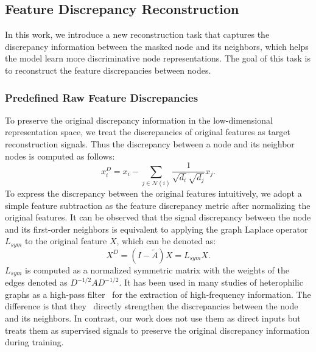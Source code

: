\documentclass[sigconf]{acmart}
\begin{document}
\subsection{Feature Discrepancy Reconstruction}
In this work, we introduce a new reconstruction task that captures the discrepancy information between the masked node and its neighbors, which helps the model learn more discriminative node representations. The goal of this task is to reconstruct the feature discrepancies between nodes.

\subsubsection{Predefined Raw Feature Discrepancies} 
To preserve the original discrepancy information in the low-dimensional representation space, we treat the discrepancies of original features as target reconstruction signals. Thus the discrepancy between a node and its neighbor nodes is computed as follows:
\begin{equation}
x_i^{D} = x_i-\sum\limits_{j \in \mathcal{N}(i)}\frac{1}{\sqrt{d_i} \sqrt{d_j}}x_j.\label{Eq4}
\end{equation}
To express the discrepancy between the original features intuitively, we adopt a simple feature subtraction as the feature discrepancy metric after normalizing the original features. It can be observed that the signal discrepancy between the node and its first-order neighbors is equivalent to applying the graph Laplace operator $L_{sym}$ to the original feature $X$, which can be denoted as:
\begin{equation}
    X^D = (I- \widetilde{A})X = L_{sym}X.
\end{equation}
$L_{sym}$ is computed as a normalized symmetric matrix with the weights of the edges denoted as $D^{-1/2}AD^{-1/2}$. It has been used in many studies of heterophilic graphs as a high-pass filter~\cite{fagcn, acmgnn} for the extraction of high-frequency information. The difference is that they~\cite{fagcn, acmgnn} directly strengthen the discrepancies between the node and its neighbors. In contrast, our work does not use them as direct inputs but treats them as supervised signals to preserve the original discrepancy information during training.
\end{document}
